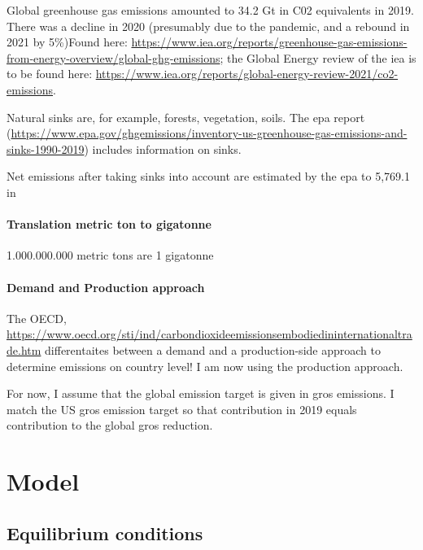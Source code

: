 Global greenhouse gas emissions amounted to 34.2 Gt in C02 equivalents in 2019. There was a decline in 2020 (presumably due to the pandemic, and a rebound in 2021 by 5\%)Found here: \url{https://www.iea.org/reports/greenhouse-gas-emissions-from-energy-overview/global-ghg-emissions}; the Global Energy review of the iea is to  be found here: \url{https://www.iea.org/reports/global-energy-review-2021/co2-emissions}.

Natural sinks are, for example, forests, vegetation, soils. 
The epa report (\url{https://www.epa.gov/ghgemissions/inventory-us-greenhouse-gas-emissions-and-sinks-1990-2019}) includes information on sinks. 

Net emissions after taking sinks into account are estimated by the epa to 5,769.1 in 
\paragraph{Translation metric ton to gigatonne}
1.000.000.000 metric tons are 1 gigatonne 

\paragraph{Demand and Production approach}
The OECD, \url{https://www.oecd.org/sti/ind/carbondioxideemissionsembodiedininternationaltrade.htm} differentaites between a demand and a production-side approach to determine emissions on country level! I am now using the production approach. 

For now, I assume that the global emission target is given in gros emissions. I match the US gros emission target so that contribution in 2019 equals contribution to the global gros reduction. 

\section{Model}
\subsection{Equilibrium conditions}

